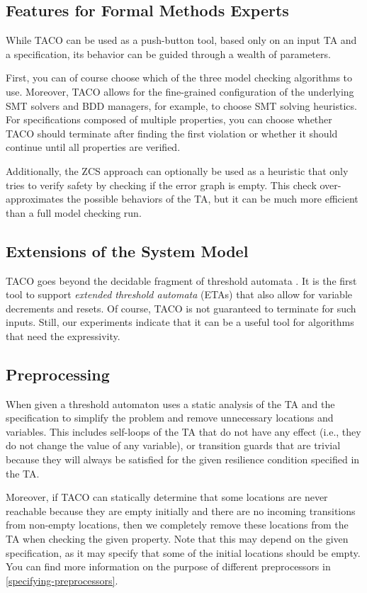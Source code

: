 \documentclass{article}
\begin{document}
    \subsection{Features for Formal Methods Experts}
    While TACO can be used as a push-button tool, based only on an input TA and a specification, its behavior can be guided through a wealth of parameters.

    First, you can of course choose which of the three model checking algorithms to use. 
    Moreover, TACO allows for the fine-grained configuration of the underlying SMT solvers and BDD managers, for example, to choose SMT solving heuristics.
    For specifications composed of multiple properties, you can choose whether TACO should terminate after finding the first violation or whether it should continue until all properties are verified.

    Additionally, the ZCS approach can optionally be used as a heuristic that only tries to verify safety by checking if the error graph is empty.
    This check over-approximates the possible behaviors of the TA, but it can be much more efficient than a full model checking run.

    \subsection{Extensions of the System Model}
    TACO goes beyond the decidable fragment of threshold automata \citep{KonnovVW14,Kukovec0W18}.
    It is the first tool to support \emph{extended threshold automata} (ETAs) \citep{KonnovVW14,BaumeisterEJSV24} that also allow for variable decrements and resets. Of course, TACO is not guaranteed to terminate for such inputs. Still, our experiments indicate that it can be a useful tool for algorithms that need the expressivity. 

    \subsection{Preprocessing}
    When given a threshold automaton uses a static analysis of the TA and the specification to simplify the problem and remove unnecessary locations and variables. 
    This includes self-loops of the TA that do not have any effect (i.e., they do not change the value of any variable), or transition guards that are trivial because they will always be satisfied for the given resilience condition specified in the TA.

    Moreover, if TACO can statically determine that some locations are never reachable because they are empty initially and there are no incoming transitions from non-empty locations, then we completely remove these locations from the TA when checking the given property.
    Note that this may depend on the given specification, as it may specify that some of the initial locations should be empty. 
    You can find more information on the purpose of different preprocessors in \cref{specifying-preprocessors}.
\end{document}
